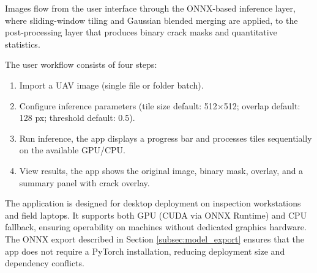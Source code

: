 \hs Images flow from the user interface through the ONNX-based inference layer, where sliding-window tiling and Gaussian blended merging are applied, to the post-processing layer that produces binary crack masks and quantitative statistics.

\hs The user workflow consists of four steps:

\begin{enumerate}
    \item Import a UAV image (single file or folder batch).

    \item Configure inference parameters (tile size default: 512×512; overlap default: 128 px; threshold default: 0.5).

    \item Run inference, the app displays a progress bar and processes tiles sequentially on the available GPU/CPU.

    \item View results, the app shows the original image, binary mask, overlay, and a summary panel with crack overlay.
\end{enumerate}

\hs The application is designed for desktop deployment on inspection workstations and field laptops. It supports both GPU (CUDA via ONNX Runtime) and CPU fallback, ensuring operability on machines without dedicated graphics hardware. The ONNX export described in Section \ref{subsec:model_export} ensures that the app does not require a PyTorch installation, reducing deployment size and dependency conflicts.